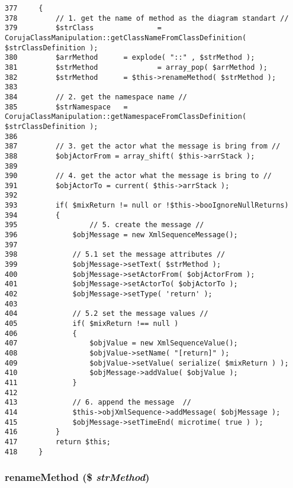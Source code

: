 \begin{Code}\begin{verbatim}377     {
378         // 1. get the name of method as the diagram standart //
379         $strClass               = CorujaClassManipulation::getClassNameFromClassDefinition( $strClassDefinition );
380         $arrMethod      = explode( "::" , $strMethod );
381         $strMethod              = array_pop( $arrMethod );
382         $strMethod      = $this->renameMethod( $strMethod );
383         
384         // 2. get the namespace name //
385         $strNamespace   = CorujaClassManipulation::getNamespaceFromClassDefinition( $strClassDefinition );
386 
387         // 3. get the actor what the message is bring from //
388         $objActorFrom = array_shift( $this->arrStack );
389 
390         // 4. get the actor what the message is bring to //
391         $objActorTo = current( $this->arrStack );
392 
393         if( $mixReturn != null or !$this->booIgnoreNullReturns)
394         {
395                 // 5. create the message //
396             $objMessage = new XmlSequenceMessage();
397             
398             // 5.1 set the message attributes //
399             $objMessage->setText( $strMethod );
400             $objMessage->setActorFrom( $objActorFrom );
401             $objMessage->setActorTo( $objActorTo );
402             $objMessage->setType( 'return' );
403 
404             // 5.2 set the message values //
405             if( $mixReturn !== null )
406             {
407                 $objValue = new XmlSequenceValue();
408                 $objValue->setName( "[return]" );
409                 $objValue->setValue( serialize( $mixReturn ) );
410                 $objMessage->addValue( $objValue );
411             }
412 
413             // 6. append the message  //
414             $this->objXmlSequence->addMessage( $objMessage );
415             $objMessage->setTimeEnd( microtime( true ) );
416         }
417         return $this;
418     }
\end{verbatim}
\end{Code}


\hypertarget{class_code_instrumentation_receiver_20bedeec5c454d58b3b5a3b579225323}{
\subsubsection[{renameMethod}]{\setlength{\rightskip}{0pt plus 5cm}renameMethod (\$ {\em strMethod})}}
\label{class_code_instrumentation_receiver_20bedeec5c454d58b3b5a3b579225323}


